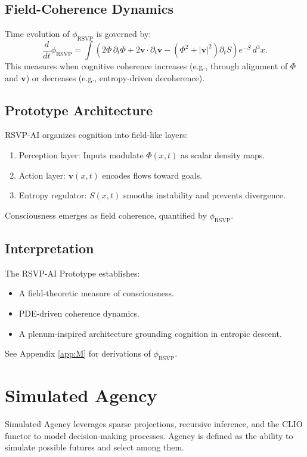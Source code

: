 \documentclass[12pt]{report}
\begin{document}
\section{Field-Coherence Dynamics}
Time evolution of \(\phi_{\text{RSVP}}\) is governed by:
\[
\frac{d}{dt} \phi_{\text{RSVP}} = \int \left( 2\Phi \, \partial_t \Phi + 2\mathbf{v}\cdot \partial_t \mathbf{v} - (\Phi^2+|\mathbf{v}|^2)\partial_t S \right) e^{-S} \, d^3x.
\]
This measures when cognitive coherence increases (e.g., through alignment of \(\Phi\) and \(\mathbf{v}\)) or decreases (e.g., entropy-driven decoherence).

\section{Prototype Architecture}
RSVP-AI organizes cognition into field-like layers:
\begin{enumerate}
    \item Perception layer: Inputs modulate \(\Phi(x,t)\) as scalar density maps.
    \item Action layer: \(\mathbf{v}(x,t)\) encodes flows toward goals.
    \item Entropy regulator: \(S(x,t)\) smooths instability and prevents divergence.
\end{enumerate}
Consciousness emerges as field coherence, quantified by \(\phi_{\text{RSVP}}\).

\section{Interpretation}
The RSVP-AI Prototype establishes:
\begin{itemize}
    \item A field-theoretic measure of consciousness.
    \item PDE-driven coherence dynamics.
    \item A plenum-inspired architecture grounding cognition in entropic descent.
\end{itemize}
See Appendix \ref{app:M} for derivations of \(\phi_{\text{RSVP}}\).

\chapter{Simulated Agency}
\label{chap:simulated-agency}
Simulated Agency leverages sparse projections, recursive inference, and the CLIO functor to model decision-making processes. Agency is defined as the ability to simulate possible futures and select among them.
\end{document}
